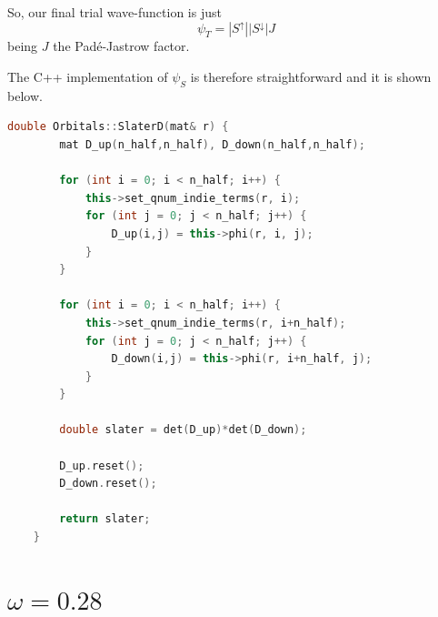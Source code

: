 \documentclass[a4paper,twoside,11pt]{book}
\begin{document}
So, our final trial wave-function is just
\begin{equation}
	\psi_T = |S^{\uparrow}||S^{\downarrow}|J
\end{equation}
being $J$ the Padé-Jastrow factor.

The C++ implementation of $\psi_S$ is therefore straightforward and it is shown below.

\begin{lstlisting}[language=cpp]
	double Orbitals::SlaterD(mat& r) {
	    mat D_up(n_half,n_half), D_down(n_half,n_half);
	
	    for (int i = 0; i < n_half; i++) {
	        this->set_qnum_indie_terms(r, i);
	        for (int j = 0; j < n_half; j++) {
	            D_up(i,j) = this->phi(r, i, j);
	        }
	    }
	
	    for (int i = 0; i < n_half; i++) {
	        this->set_qnum_indie_terms(r, i+n_half);
	        for (int j = 0; j < n_half; j++) {
	            D_down(i,j) = this->phi(r, i+n_half, j);
	        }
	    }
	
	    double slater = det(D_up)*det(D_down);
	
	    D_up.reset();
	    D_down.reset();
	
	    return slater;
	}
\end{lstlisting}


\section{$\omega = 0.28$}
\end{document}
